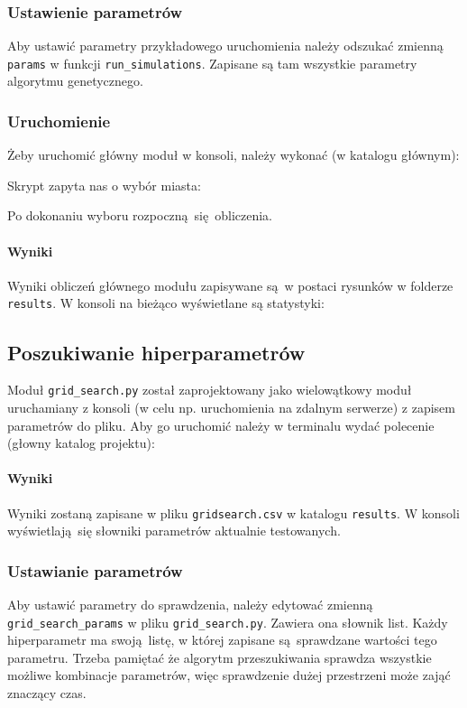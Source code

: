 \documentclass[12pt,a4paper]{article}
\begin{document}
\subsubsection{Ustawienie parametrów}
Aby ustawić parametry przykładowego uruchomienia należy odszukać zmienną \lstinline|params| w funkcji \lstinline|run_simulations|. Zapisane są tam wszystkie parametry algorytmu genetycznego.

\subsubsection{Uruchomienie}
Żeby uruchomić główny moduł w konsoli, należy wykonać (w katalogu głównym):


Skrypt zapyta nas o wybór miasta:

Po dokonaniu wyboru rozpoczną się obliczenia.

\paragraph{Wyniki}
Wyniki obliczeń głównego modułu zapisywane są w postaci rysunków w folderze \lstinline|results|. W konsoli na bieżąco wyświetlane są statystyki:


\subsection{Poszukiwanie hiperparametrów}
Moduł \lstinline|grid_search.py| został zaprojektowany jako wielowątkowy moduł uruchamiany z konsoli (w celu np. uruchomienia na zdalnym serwerze) z zapisem parametrów do pliku. Aby go uruchomić należy w terminalu wydać polecenie (głowny katalog projektu):


\paragraph{Wyniki}
Wyniki zostaną zapisane w pliku \lstinline|gridsearch.csv| w katalogu \lstinline|results|. W konsoli wyświetlają się słowniki parametrów aktualnie testowanych.

\subsubsection{Ustawianie parametrów}
Aby ustawić parametry do sprawdzenia, należy edytować zmienną \lstinline|grid_search_params| w pliku \lstinline|grid_search.py|. Zawiera ona słownik list. Każdy hiperparametr ma swoją listę, w której zapisane są sprawdzane wartości tego parametru. Trzeba pamiętać że algorytm przeszukiwania sprawdza wszystkie możliwe kombinacje parametrów, więc sprawdzenie dużej przestrzeni może zająć znaczący czas.
\end{document}

